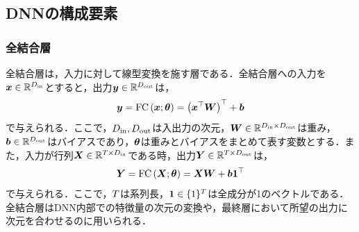 \subsection{DNNの構成要素}
\subsubsection{全結合層}
全結合層は，入力に対して線型変換を施す層である．全結合層への入力を$\bm{x} \in \mathbb{R}^{D_{\text{in}}}$とすると，出力$\bm{y} \in \mathbb{R}^{D_{\text{out}}}$は，
\begin{equation}
    \bm{y} = \text{FC}\left(\bm{x}; \bm{\theta}\right) = \left(\bm{x}^{\top} \bm{W}\right)^{\top} + \bm{b}
\end{equation}
で与えられる．ここで，$D_{\text{in}}, D_{\text{out}}$は入出力の次元，$\bm{W} \in \mathbb{R}^{D_{\text{in}} \times D_{\text{out}}}$は重み，$\bm{b} \in \mathbb{R}^{D_{\text{out}}}$はバイアスであり，$\bm{\theta}$は重みとバイアスをまとめて表す変数とする．また，入力が行列$\bm{X} \in \mathbb{R}^{T \times D_{\text{in}}}$である時，出力$\bm{Y} \in \mathbb{R}^{T \times D_{\text{out}}}$は，
\begin{equation}
    \bm{Y} = \text{FC}\left(\bm{X}; \bm{\theta}\right) = \bm{X} \bm{W} + \bm{b} \bm{1}^{\top}
\end{equation}
で与えられる．ここで，$T$は系列長，$\bm{1} \in \{1\}^{T}$は全成分が1のベクトルである．全結合層はDNN内部での特徴量の次元の変換や，最終層において所望の出力に次元を合わせるのに用いられる．

